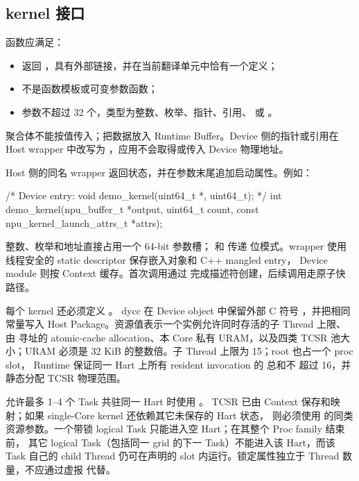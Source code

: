 \documentclass[../dayan_kernel_manual.tex]{subfiles}
\begin{document}
\subsection{kernel 接口}

 函数应满足：

\begin{itemize}
  \item 返回 ，具有外部链接，并在当前翻译单元中恰有一个定义；
  \item 不是函数模板或可变参数函数；
  \item 参数不超过 32 个，类型为整数、枚举、指针、引用、 或
        。
\end{itemize}

聚合体不能按值传入；把数据放入 Runtime Buffer。Device 侧的指针或引用在 Host
wrapper 中改写为 ，应用不会取得或传入 Device 物理地址。

Host 侧的同名 wrapper 返回状态，并在参数末尾追加启动属性。例如：

\begin{dayancode}
/* Device entry: void demo_kernel(uint64_t *, uint64_t); */
int demo_kernel(npu_buffer_t *output, uint64_t count,
                const npu_kernel_launch_attrs_t *attrs);
\end{dayancode}

整数、枚举和地址直接占用一个 64-bit 参数槽； 和  传递
位模式。wrapper 使用线程安全的 static descriptor 保存嵌入对象和 C++ mangled entry，
Device module 则按 Context 缓存。首次调用通过
 完成描述符创建，后续调用走原子快路径。

每个 kernel 还必须定义
。
dycc 在 Device object 中保留外部 C 符号 ，并把相同常量写入
Host Package。资源值表示一个实例允许同时存活的子 Thread 上限、由
 寻址的 atomic-cache allocation、本 Core 私有 URAM，以及四类 TCSR
池大小；URAM 必须是 32 KiB 的整数倍。子 Thread 上限为 15；root 也占一个 proc slot，
Runtime 保证同一 Hart 上所有 resident invocation 的  总和不
超过 16，并静态分配 TCSR 物理范围。

允许最多 1--4 个 Task 共驻同一 Hart 时使用
。
TCSR 已由 Context 保存和映射；如果 single-Core kernel 还依赖其它未保存的 Hart 状态，
则必须使用  的同类资源参数。一个带锁 logical Task
只能进入空 Hart；在其整个 Proc family 结束前，
其它 logical Task（包括同一 grid 的下一 Task）不能进入该 Hart，而该 Task 自己的 child
Thread 仍可在声明的 slot 内运行。锁定属性独立于 Thread 数量，不应通过虚报
 代替。
\end{document}
